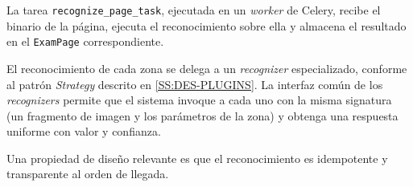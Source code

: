 La tarea \texttt{recognize\_page\_task}, ejecutada en un \textit{worker}
de Celery, recibe el binario de la página, ejecuta el reconocimiento sobre
ella y almacena el resultado en el \texttt{ExamPage} correspondiente.

El reconocimiento de cada zona se delega a un \textit{recognizer}
especializado, conforme al patrón \textit{Strategy} descrito en
\cref{SS:DES-PLUGINS}. La interfaz común de los \textit{recognizers}
permite que el sistema invoque a cada uno con la misma signatura (un
fragmento de imagen y los parámetros de la zona) y obtenga una respuesta
uniforme con valor y confianza.

Una propiedad de diseño relevante es que el reconocimiento es idempotente
y transparente al orden de llegada.
